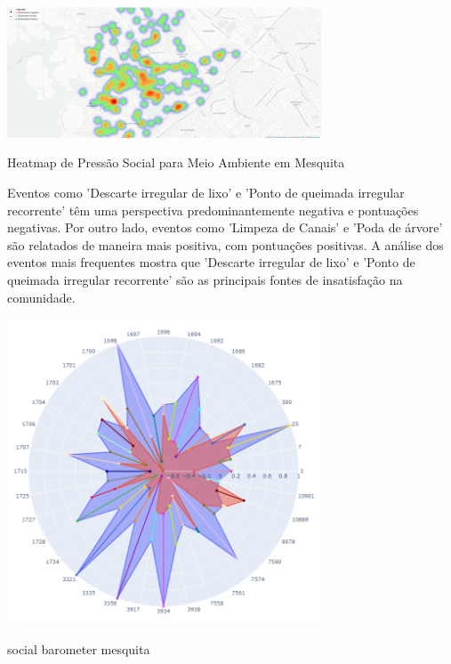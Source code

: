 \begin{quadro}[htb]
	\centering
	\includegraphics[width=0.7\textwidth]{images/heatmap_mesquita.PNG}
	\caption{Heatmap de Pressão Social para Meio Ambiente em Mesquita}
	\label{fig:heatmap_mesquita}
\end{quadro}

Eventos como 'Descarte irregular de lixo' e 'Ponto de queimada irregular recorrente' têm uma perspectiva predominantemente negativa e pontuações negativas. Por outro lado, eventos como 'Limpeza de Canais' e 'Poda de árvore' são relatados de maneira mais positiva, com pontuações positivas. A análise dos eventos mais frequentes mostra que 'Descarte irregular de lixo' e 'Ponto de queimada irregular recorrente' são as principais fontes de insatisfação na comunidade.

\begin{quadro}[htb]
	\centering
	\includegraphics[width=0.7\textwidth]{images/social_barometer_mesquita.png}
	\caption{social barometer mesquita}
	\label{fig:social_barometer_mesquita}
\end{quadro}


